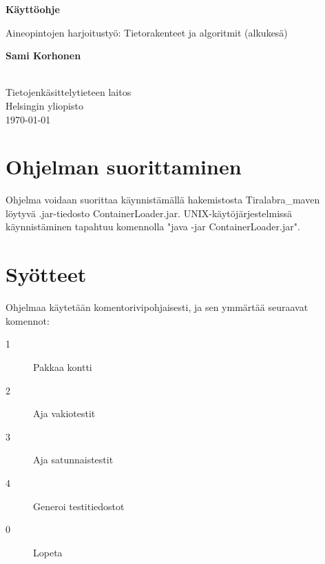 \documentclass[a4paper,12pt, titlepage]{article}
\begin{document}
\begin{titlepage}
    \begin{center}
        \vspace*{1cm}
        
        \LARGE
        \textbf{Käyttöohje}
        
        \vspace{0.5cm}
        \Large
        Aineopintojen harjoitustyö: Tietorakenteet ja algoritmit (alkukesä)
        
        \vspace{1.5cm}
        
        \large
        \textbf{Sami Korhonen} \\
         \\
        
		\vfill        
        \normalsize
        Tietojenkäsittelytieteen laitos\\
        Helsingin yliopisto\\
		\large        
        \today
        
    \end{center}
\end{titlepage}



\section*{Ohjelman suorittaminen}
Ohjelma voidaan suorittaa käynnistämällä hakemistosta Tiralabra\_maven löytyvä .jar-tiedosto ContainerLoader.jar. UNIX-käytöjärjestelmissä käynnistäminen tapahtuu komennolla "java -jar ContainerLoader.jar".

\section*{Syötteet}
Ohjelmaa käytetään komentorivipohjaisesti, ja sen ymmärtää seuraavat komennot:

\begin{description}
  \item[1] Pakkaa kontti
  \item[2] Aja vakiotestit
  \item[3] Aja satunnaistestit
  \item[4] Generoi testitiedostot
  \item[0] Lopeta
\end{description}
\end{document}
